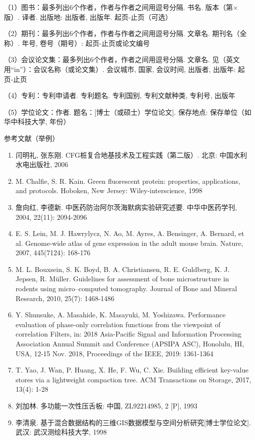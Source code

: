 （1）图书：最多列出6个作者，作者与作者之间用逗号分隔. 书名. 版本（第×版）. 译者. 出版地: 出版者, 出版年. 起页-止页（可选）

（2）期刊：最多列出6个作者，作者与作者之间用逗号分隔. 文章名. 期刊名（全称）. 年号, 卷号（期号）: 起页-止页或论文编号

（3）会议论文集：最多列出6个作者，作者之间用逗号分隔. 文章名. 见（英文用“in”）：会议名称（或论文集）. 会议城市, 国家, 会议时间, 出版者, 出版年: 起页-止页

（4）专利：专利申请者. 专利题名. 专利国别, 专利文献种类, 专利号, 出版年

（5）学位论文：作者. 题名：[博士（或硕士）学位论文]. 保存地点: 保存单位（如华中科技大学, 年份）

参考文献（举例）
\begin{enumerate}
\renewcommand{\labelenumi}{[\theenumi]}
\item	闫明礼, 张东刚. CFG桩复合地基技术及工程实践（第二版）. 北京: 中国水利水电出版社, 2006

\item	M. Chalfie, S. R. Kain. Green fluorescent protein: properties, applications, and protocols. Hoboken, New Jersey: Wiley-interscience, 1998

\item	詹向红, 李德新. 中医药防治阿尔茨海默病实验研究述要. 中华中医药学刊, 2004, 22(11): 2094-2096

\item	E. S. Lein, M. J. Hawrylycz, N. Ao, M. Ayres, A. Bensinger, A. Bernard, et al. Genome-wide atlas of gene expression in the adult mouse brain. Nature, 2007, 445(7124): 168-176

\item	M. L. Bouxsein, S. K. Boyd, B. A. Christiansen, R. E. Guldberg, K. J. Jepsen, R. Müller. Guidelines for assessment of bone microstructure in rodents using micro–computed tomography. Journal of Bone and Mineral Research, 2010, 25(7): 1468-1486

\item	Y. Shunsuke, A. Masahide, K. Masayuki, M. Yoshizawa. Performance evaluation of phase-only correlation functions from the viewpoint of correlation Filters, in: 2018 Asia-Pacific Signal and Information Processing Association Annual Summit and Conference (APSIPA ASC), Honolulu, HI, USA, 12-15 Nov. 2018, Proceedings of the IEEE, 2019: 1361-1364

\item	T. Yao, J. Wan, P. Huang, X. He, F. Wu, C. Xie. Building efficient key-value stores via a lightweight compaction tree. ACM Transactions on Storage, 2017, 13(4): 1-28

\item	刘加林. 多功能一次性压舌板: 中国, ZL92214985, 2 [P], 1993

\item	李清泉. 基于混合数据结构的三维GIS数据模型与空间分析研究[博士学位论文]. 武汉: 武汉测绘科技大学, 1998

\end{enumerate}

